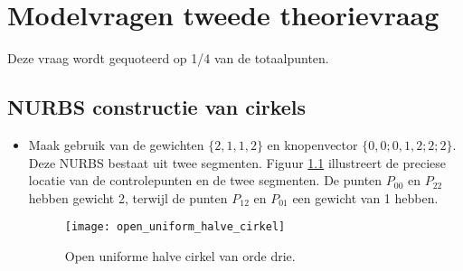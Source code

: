 \documentclass{report}
\begin{document}
\chapter{Modelvragen tweede theorievraag}
Deze vraag wordt gequoteerd op 1/4 van de totaalpunten.
	
\section{NURBS constructie van cirkels }
\begin{enumerate}
	{\begin{itemize} 
		\item Maak gebruik van de gewichten $\{2, 1, 1, 2\}$ en knopenvector $\{0,0;0,1,2;2;2\}$. Deze NURBS bestaat uit twee segmenten. Figuur \ref{fig:open_uniform_halve_cirkel} illustreert de preciese locatie van de controlepunten en de twee segmenten. De punten $P_{00}$ en $P_{22}$ hebben gewicht 2, terwijl de punten $P_{12}$ en $P_{01}$ een gewicht van 1 hebben.
		\begin{figure}[ht]
			\centering
			\texttt{[image: open\_uniform\_halve\_cirkel]}
			\caption{Open uniforme halve cirkel van orde drie.}
			\label{fig:open_uniform_halve_cirkel} 
		\end{figure}
		\end{itemize}
	}


\end{enumerate}
\end{document}
